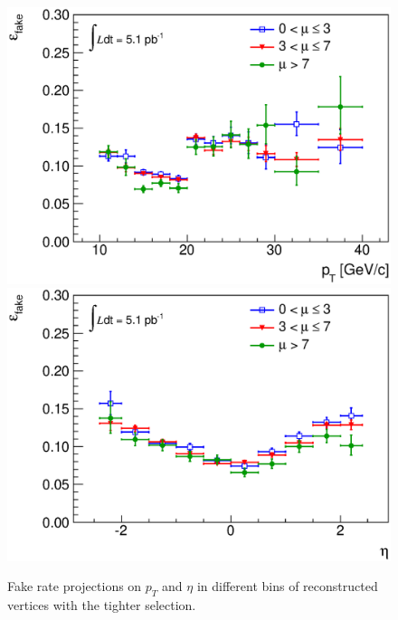 \begin{figure}[!htbp]
\begin{center}
\includegraphics[scale=0.5]{figures/frpt_pu.eps}
\includegraphics[scale=0.5]{figures/freta_pu.eps}
\caption{Fake rate projections on $p_T$ and $\eta$ in different bins of reconstructed vertices with the tighter selection.}
\label{fig:mufakerate1}
\end{center}
\end{figure}
